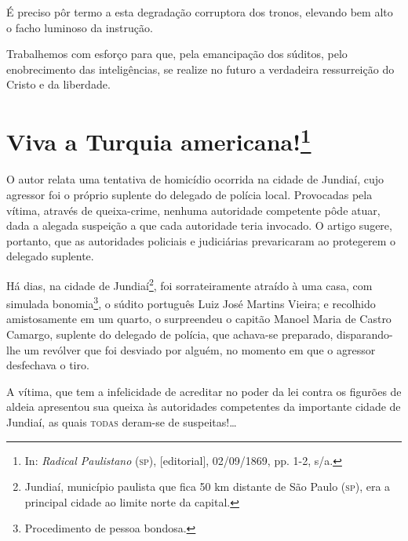 É preciso pôr termo a esta degradação corruptora dos tronos, elevando
bem alto o facho luminoso da instrução.

Trabalhemos com esforço para que, pela emancipação dos súditos, pelo
enobrecimento das inteligências, se realize no futuro a verdadeira
ressurreição do Cristo e da liberdade.

\chapter{Viva a Turquia americana!\footnote{In: \emph{Radical Paulistano}
  (\textsc{sp}), {[}editorial{]}, 02/09/1869, pp. 1-2, s/a.}}

\begin{didascalia}
O autor relata uma tentativa de homicídio ocorrida na cidade de Jundiaí,
cujo agressor foi o próprio suplente do delegado de polícia local.
Provocadas pela vítima, através de queixa-crime, nenhuma autoridade
competente pôde atuar, dada a alegada suspeição a que cada autoridade
teria invocado. O artigo sugere, portanto, que as autoridades policiais
e judiciárias prevaricaram ao protegerem o delegado suplente.
\end{didascalia}



Há dias, na cidade de Jundiaí\footnote{Jundiaí, município paulista que
  fica 50 km distante de São Paulo (\textsc{sp}), era a principal cidade ao
  limite norte da capital.}, foi sorrateiramente atraído à uma casa, com
simulada bonomia\footnote{Procedimento de pessoa bondosa.}, o súdito
português Luiz José Martins Vieira; e recolhido amistosamente em um
quarto, o surpreendeu o capitão Manoel Maria de Castro Camargo, suplente
do delegado de polícia, que achava-se preparado, disparando-lhe um
revólver que foi desviado por alguém, no momento em que o agressor
desfechava o tiro.

A vítima, que tem a infelicidade de acreditar no poder da lei contra os
figurões de aldeia apresentou sua queixa às autoridades competentes da
importante cidade de Jundiaí, as quais \textsc{todas} deram-se de suspeitas!\ldots{}


